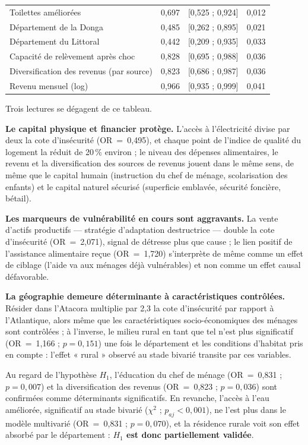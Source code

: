 \begin{table}[H]
\begin{tabular}{lrrr}
Toilettes améliorées                           & 0,697 & [0,525 ; 0,924] & 0,012 \\
Département de la Donga                        & 0,485 & [0,262 ; 0,895] & 0,021 \\
Département du Littoral                        & 0,442 & [0,209 ; 0,935] & 0,033 \\
Capacité de relèvement après choc              & 0,828 & [0,695 ; 0,988] & 0,036 \\
Diversification des revenus (par source)       & 0,823 & [0,686 ; 0,987] & 0,036 \\
Revenu mensuel (log)                           & 0,966 & [0,935 ; 0,999] & 0,041 \\
\bottomrule
\end{tabular}
\end{table}

Trois lectures se dégagent de ce tableau.

\textbf{Le capital physique et financier protège.} L'accès à l'électricité
divise par deux la cote d'insécurité (OR~=~0,495), et chaque point de l'indice
de qualité du logement la réduit de 20\,\% environ ; le niveau des dépenses
alimentaires, le revenu et la diversification des sources de revenus jouent
dans le même sens, de même que le capital humain (instruction du chef de
ménage, scolarisation des enfants) et le capital naturel sécurisé (superficie
emblavée, sécurité foncière, bétail).

\textbf{Les marqueurs de vulnérabilité en cours sont aggravants.} La vente
d'actifs productifs — stratégie d'adaptation destructrice — double la cote
d'insécurité (OR~=~2,071), signal de détresse plus que cause ; le lien positif
de l'assistance alimentaire reçue (OR~=~1,720) s'interprète de même comme un
effet de ciblage (l'aide va aux ménages déjà vulnérables) et non comme un effet
causal défavorable.

\textbf{La géographie demeure déterminante à caractéristiques contrôlées.}
Résider dans l'Atacora multiplie par 2,3 la cote d'insécurité par rapport à
l'Atlantique, alors même que les caractéristiques socio-économiques des ménages
sont contrôlées ; à l'inverse, le milieu rural en tant que tel n'est plus
significatif (OR~=~1,166 ; $p = 0{,}151$) une fois le département et les
conditions d'habitat pris en compte : l'effet « rural » observé au stade
bivarié transite par ces variables.

Au regard de l'hypothèse $H_1$, l'éducation du chef de ménage
(OR~=~0,831 ; $p = 0{,}007$) et la diversification des revenus
(OR~=~0,823 ; $p = 0{,}036$) sont confirmées comme déterminants significatifs.
En revanche, l'accès à l'eau améliorée, significatif au stade bivarié
($\chi^2$ ; $p_{aj} < 0{,}001$), ne l'est plus dans le modèle multivarié
(OR~=~0,831 ; $p = 0{,}070$), et la résidence rurale voit son effet absorbé par
le département : \textbf{$H_1$ est donc partiellement validée}.

